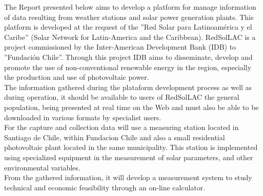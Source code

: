 The Report presented below aims to develop a platform for manage information of data resulting from weather stations and solar power generation plants. This platform is developed at the request of the ''Red Solar para Latinoamérica y el Caribe'' (Solar Network for Latin-America and the Caribbean). RedSolLAC is a project commissioned by the Inter-American Development Bank (IDB) to ''Fundación Chile''. Through this project IDB aims to disseminate, develop and promote the use of non-conventional renewable energy in the region, especially the production and use of photovoltaic power. \\

The information gathered during the plataform development process as well as during operation, it should be available to users of RedSolLAC the general population, being presented at real time on the Web and must also be able to be downloaded in various formats by specialist users. \\

For the capture and collection data will use a measuring station located in Santiago de Chile, within Fundacion Chile and also a small residential photovoltaic plant located in the same municipality. This station is implemented using specialized equipment in the measurement of solar parameters, and other environmental variables. \\

From the gathered information, it will develop a measurement system to study technical and economic feasibility through an on-line calculator. \\
